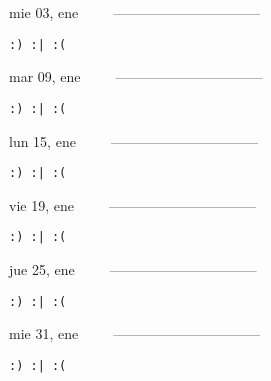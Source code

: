 \documentclass[letterpaper,10pt]{article}
\begin{document}
\begin{multicols}{3}
{mie 03, ene\ \ \ \ \ --------------------------------}
\begin{flushright}\begin{small}\texttt{:) :| :(}\end{small}\end{flushright}
\vfill
{mar 09, ene\ \ \ \ \ --------------------------------}
\begin{flushright}\begin{small}\texttt{:) :| :(}\end{small}\end{flushright}\par
\vfill
{lun 15, ene\ \ \ \ \ --------------------------------}
\begin{flushright}\begin{small}\texttt{:) :| :(}\end{small}\end{flushright}\par
\vfill
\end{multicols}
\vspace{1.05cm}

\begin{multicols}{3}
{vie 19, ene\ \ \ \ \ --------------------------------}
\begin{flushright}\begin{small}\texttt{:) :| :(}\end{small}\end{flushright}
\vfill
{jue 25, ene\ \ \ \ \ --------------------------------}
\begin{flushright}\begin{small}\texttt{:) :| :(}\end{small}\end{flushright}\par
\vfill
{mie 31, ene\ \ \ \ \ --------------------------------}
\begin{flushright}\begin{small}\texttt{:) :| :(}\end{small}\end{flushright}\par
\vfill
\end{multicols}
\vspace{1.05cm}
\end{document}
